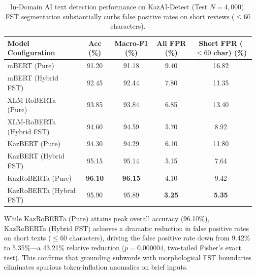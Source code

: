 \begin{table}[ht]
\centering
\small
\setlength{\tabcolsep}{3pt}
\caption{In-Domain AI text detection performance on KazAI-Detect (Test $N = 4,000$). FST segmentation substantially curbs false positive rates on short reviews ($\le 60$ characters).}
\label{tab:journal_detection_results}
\begin{tabular}{lcccc}
\toprule
\textbf{Model Configuration} & \textbf{Acc (\%)} & \textbf{Macro-F1 (\%)} & \textbf{All FPR (\%)} & \textbf{Short FPR ($\le 60$ char) (\%)} \\
\midrule
mBERT (Pure) & 91.20 & 91.18 & 9.40 & 16.82 \\
mBERT (Hybrid FST) & 92.45 & 92.44 & 7.80 & 11.35 \\
\midrule
XLM-RoBERTa (Pure) & 93.85 & 93.84 & 6.85 & 13.40 \\
XLM-RoBERTa (Hybrid FST) & 94.60 & 94.59 & 5.70 & 8.92 \\
\midrule
KazBERT (Pure) & 94.30 & 94.29 & 6.10 & 11.80 \\
KazBERT (Hybrid FST) & 95.15 & 95.14 & 5.15 & 7.64 \\
\midrule
KazRoBERTa (Pure) & \textbf{96.10} & \textbf{96.15} & 4.10 & 9.42 \\
KazRoBERTa (Hybrid FST) & 95.90 & 95.89 & \textbf{3.25} & \textbf{5.35} \\
\bottomrule
\end{tabular}
\end{table}

While KazRoBERTa (Pure) attains peak overall accuracy (96.10\%), KazRoBERTa (Hybrid FST) achieves a dramatic reduction in false positive rates on short texts ($\le 60$ characters), driving the false positive rate down from 9.42\% to 5.35\%---a 43.21\% relative reduction ($p = 0.000004$, two-tailed Fisher's exact test). This confirms that grounding subwords with morphological FST boundaries eliminates spurious token-inflation anomalies on brief inputs.

